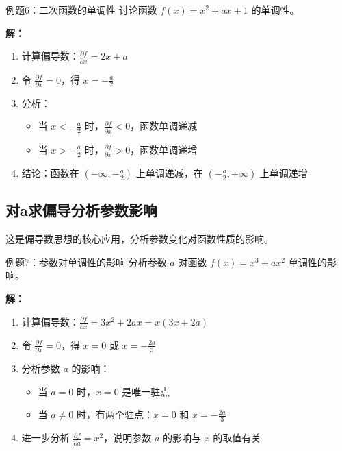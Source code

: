\documentclass[a4paper,11pt]{ctexart}
\newcommand{\partialder}[2]{\frac{\partial #1}{\partial #2}}
\theoremstyle{definition}
\theoremstyle{remark}
\begin{document}
\begin{examplebox}{例题6：二次函数的单调性}
讨论函数 $f(x) = x^2 + ax + 1$ 的单调性。

\textbf{解：}
\begin{enumerate}
    \item 计算偏导数：$\partialder{f}{x} = 2x + a$
    \item 令 $\partialder{f}{x} = 0$，得 $x = -\frac{a}{2}$
    \item 分析：
    \begin{itemize}
        \item 当 $x < -\frac{a}{2}$ 时，$\partialder{f}{x} < 0$，函数单调递减
        \item 当 $x > -\frac{a}{2}$ 时，$\partialder{f}{x} > 0$，函数单调递增
    \end{itemize}
    \item 结论：函数在 $(-\infty, -\frac{a}{2})$ 上单调递减，在 $(-\frac{a}{2}, +\infty)$ 上单调递增
\end{enumerate}
\end{examplebox}

\subsection{对a求偏导分析参数影响}

这是偏导数思想的核心应用，分析参数变化对函数性质的影响。

\begin{examplebox}{例题7：参数对单调性的影响}
分析参数 $a$ 对函数 $f(x) = x^3 + ax^2$ 单调性的影响。

\textbf{解：}
\begin{enumerate}
    \item 计算偏导数：$\partialder{f}{x} = 3x^2 + 2ax = x(3x + 2a)$
    \item 令 $\partialder{f}{x} = 0$，得 $x = 0$ 或 $x = -\frac{2a}{3}$
    \item 分析参数 $a$ 的影响：
    \begin{itemize}
        \item 当 $a = 0$ 时，$x = 0$ 是唯一驻点
        \item 当 $a \neq 0$ 时，有两个驻点：$x = 0$ 和 $x = -\frac{2a}{3}$
    \end{itemize}
    \item 进一步分析 $\partialder{f}{a} = x^2$，说明参数 $a$ 的影响与 $x$ 的取值有关
\end{enumerate}
\end{examplebox}
\end{document}
